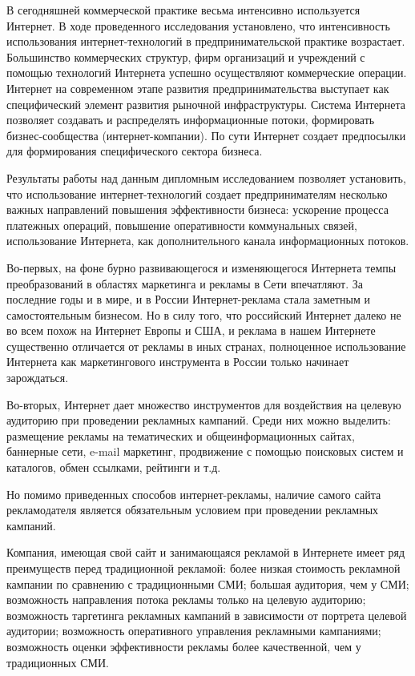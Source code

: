 \documentclass[a4paper,english,russian]{G2-105}
\begin{document}
\par В сегодняшней коммерческой практике весьма интенсивно используется Интернет. В ходе проведенного исследования установлено, что интенсивность использования интернет-технологий в предпринимательской практике возрастает. Большинство коммерческих структур, фирм организаций и учреждений с помощью технологий Интернета успешно осуществляют коммерческие операции. Интернет на современном этапе развития предпринимательства выступает как специфический элемент развития рыночной инфраструктуры. Система Интернета позволяет создавать и распределять информационные потоки, формировать бизнес-сообщества (интернет-компании). По сути Интернет создает предпосылки для формирования специфического сектора бизнеса.
\par Результаты работы над данным дипломным исследованием позволяет установить, что использование интернет-технологий создает предпринимателям несколько важных направлений повышения эффективности бизнеса: ускорение процесса платежных операций, повышение оперативности коммунальных связей, использование Интернета, как дополнительного канала информационных потоков.
\par Во-первых, на фоне бурно развивающегося и изменяющегося Интернета темпы преобразований в областях маркетинга и рекламы в Сети впечатляют. За последние годы и в мире, и в России Интернет-реклама стала заметным и самостоятельным бизнесом. Но в силу того, что российский Интернет далеко не во всем похож на Интернет Европы и США, и реклама в нашем Интернете существенно отличается от рекламы в иных странах, полноценное использование Интернета как маркетингового инструмента в России только начинает зарождаться.
\par Во-вторых, Интернет дает множество инструментов для воздействия на целевую аудиторию при проведении рекламных кампаний. Среди них можно выделить: размещение рекламы на тематических и общеинформационных сайтах, баннерные сети, e-mail маркетинг, продвижение с помощью поисковых систем и каталогов, обмен ссылками, рейтинги и т.д.
\par Но помимо приведенных способов интернет-рекламы, наличие самого сайта рекламодателя является обязательным условием при проведении рекламных кампаний.
\par Компания, имеющая свой сайт и занимающаяся рекламой в Интернете имеет ряд преимуществ перед традиционной рекламой: более низкая стоимость рекламной кампании по сравнению с традиционными СМИ; большая аудитория, чем у СМИ; возможность направления потока рекламы только на целевую аудиторию; возможность таргетинга рекламных кампаний в зависимости от портрета целевой аудитории; возможность оперативного управления рекламными кампаниями; возможность оценки эффективности рекламы более качественной, чем у традиционных СМИ.
\end{document}
